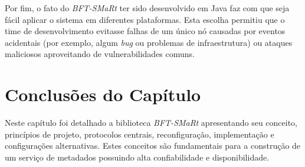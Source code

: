 	 	Por fim, o fato do \textit{BFT-SMaRt} ter sido desenvolvido em Java faz com que seja fácil aplicar o sistema em diferentes plataformas. Esta escolha permitiu que o time de desenvolvimento evitasse falhas de um único nó causadas por eventos acidentais (por exemplo, algum \textit{bug} ou problemas de infraestrutura) ou ataques maliciosos aproveitando de vulnerabilidades comuns.  \\
	   
	
		
		\section{Conclusões do Capítulo}
	Neste capítulo foi detalhado a biblioteca \textit{BFT-SMaRt} apresentando seu conceito, princípios de projeto, protocolos centrais, reconfiguração, implementação e configurações alternativas.	Estes conceitos são fundamentais para a construção de um serviço de metadados possuindo alta confiabilidade e disponibilidade. 
	